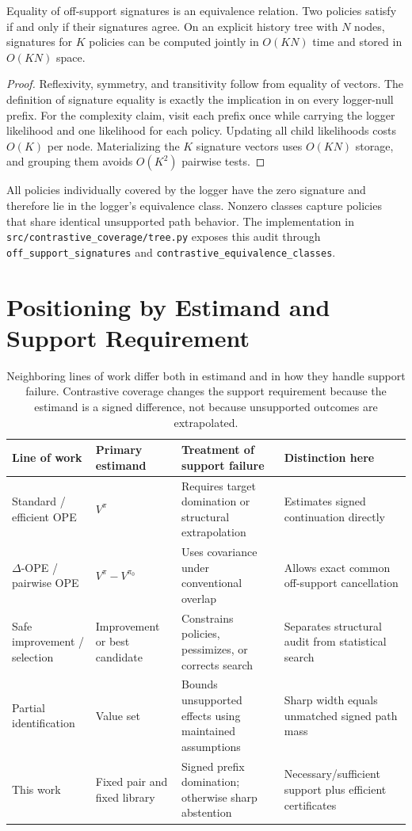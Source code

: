 \begin{proposition}
Equality of off-support signatures is an equivalence relation. Two policies satisfy \UCC if and only if their signatures agree. On an explicit history tree with $N$ nodes, signatures for $K$ policies can be computed jointly in $O(KN)$ time and stored in $O(KN)$ space.
\end{proposition}
\begin{proof}
Reflexivity, symmetry, and transitivity follow from equality of vectors. The definition of signature equality is exactly the implication in \UCC on every logger-null prefix. For the complexity claim, visit each prefix once while carrying the logger likelihood and one likelihood for each policy. Updating all child likelihoods costs $O(K)$ per node. Materializing the $K$ signature vectors uses $O(KN)$ storage, and grouping them avoids $O(K^2)$ pairwise tests.
\end{proof}

All policies individually covered by the logger have the zero signature and therefore lie in the logger's equivalence class. Nonzero classes capture policies that share identical unsupported path behavior. The implementation in \texttt{src/contrastive\_coverage/tree.py} exposes this audit through \texttt{off\_support\_signatures} and \texttt{contrastive\_equivalence\_classes}.


\section{Positioning by Estimand and Support Requirement}

\begin{table}[t]
\centering
\footnotesize
\setlength{\tabcolsep}{4.2pt}
\begin{tabular}{@{}p{1.15in}p{1.15in}p{2.05in}p{2.05in}@{}}
\toprule
Line of work & Primary estimand & Treatment of support failure & Distinction here \\
\midrule
Standard / efficient OPE & $V^\pi$ & Requires target domination or structural extrapolation & Estimates signed continuation directly \\
$\Delta$-OPE / pairwise OPE & $V^\pi-V^{\pi_0}$ & Uses covariance under conventional overlap & Allows exact common off-support cancellation \\
Safe improvement / selection & Improvement or best candidate & Constrains policies, pessimizes, or corrects search & Separates structural audit from statistical search \\
Partial identification & Value set & Bounds unsupported effects using maintained assumptions & Sharp width equals unmatched signed path mass \\
This work & Fixed pair and fixed library & Signed prefix domination; otherwise sharp abstention & Necessary/sufficient support plus efficient certificates \\
\bottomrule
\end{tabular}
\caption{Neighboring lines of work differ both in estimand and in how they handle support failure. Contrastive coverage changes the support requirement because the estimand is a signed difference, not because unsupported outcomes are extrapolated.}
\label{tab:supprelated}
\end{table}
